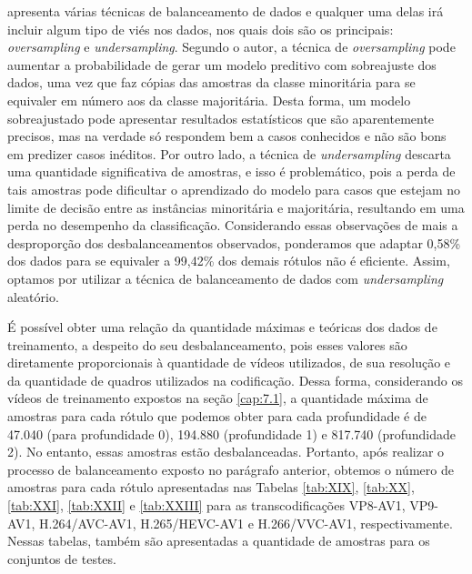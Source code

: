 \citet{bib:livroimbalanced} apresenta várias técnicas de balanceamento de dados e qualquer uma delas irá incluir algum tipo de viés nos dados, nos quais dois são os principais: \textit{oversampling} e \textit{undersampling}. Segundo o autor, a técnica de \textit{oversampling} pode aumentar a probabilidade de gerar um modelo preditivo com sobreajuste dos dados, uma vez que faz cópias das amostras da classe minoritária para se equivaler em número aos da classe majoritária. Desta forma, um modelo sobreajustado pode apresentar resultados estatísticos que são aparentemente precisos, mas na verdade só respondem bem a casos conhecidos e não são bons em predizer casos inéditos. Por outro lado, a técnica de \textit{undersampling} descarta uma quantidade significativa de amostras, e isso é problemático, pois a perda de tais amostras pode dificultar o aprendizado do modelo para casos que estejam no limite de decisão entre as instâncias minoritária e majoritária, resultando em uma perda no desempenho da classificação. Considerando essas observações de \citet{bib:livroimbalanced} mais a desproporção dos desbalanceamentos observados, ponderamos que adaptar 0,58\% dos dados para se equivaler a 99,42\% dos demais rótulos não é eficiente. Assim, optamos por utilizar a técnica de balanceamento de dados com \textit{undersampling} aleatório.

É possível obter uma relação da quantidade máximas e teóricas dos dados de treinamento, a despeito do seu desbalanceamento, pois esses valores são diretamente proporcionais à quantidade de vídeos utilizados, de sua resolução e da quantidade de quadros utilizados na codificação. Dessa forma, considerando os vídeos de treinamento expostos na seção \ref{cap:7.1}, a quantidade máxima de amostras para cada rótulo que podemos obter para cada profundidade é de 47.040 (para profundidade 0), 194.880 (profundidade 1) e 817.740 (profundidade 2). No entanto, essas amostras estão desbalanceadas. Portanto, após realizar o processo de balanceamento exposto no parágrafo anterior, obtemos o número de amostras para cada rótulo apresentadas nas Tabelas \ref{tab:XIX}, \ref{tab:XX}, \ref{tab:XXI}, \ref{tab:XXII} e \ref{tab:XXIII} para as transcodificações VP8-AV1, VP9-AV1, H.264/AVC-AV1, H.265/HEVC-AV1 e H.266/VVC-AV1, respectivamente. Nessas tabelas, também são apresentadas a quantidade de amostras para os conjuntos de testes.







